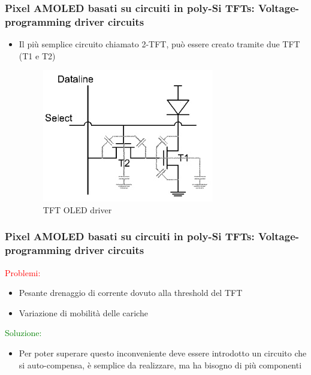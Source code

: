 \documentclass[12pt]{beamer}
\begin{document}
	\begin{frame}
		\frametitle{Pixel AMOLED basati su circuiti in poly-Si TFTs: Voltage-programming driver circuits}
		\begin{itemize}
			\item Il più semplice circuito chiamato 2-TFT, può essere creato tramite due TFT (T1 e T2)
			\begin{figure}
				\centering
				\includegraphics[width=0.7\linewidth]{FISICA/tft_oled_driver}
				\caption{TFT OLED driver}
				\label{fig:tftoleddriver}
			\end{figure}
		\end{itemize}
	\end{frame}
	\begin{frame}
		\frametitle{Pixel AMOLED basati su circuiti in poly-Si TFTs: Voltage-programming driver circuits}
		\textcolor{red}{Problemi:}
		\begin{itemize}
			\item Pesante drenaggio di corrente dovuto alla threshold del TFT
			\item Variazione di mobilità delle cariche
		\end{itemize}
		\pause
		\textcolor{green}{Soluzione:}
		\pause
		\begin{itemize}
			\item Per poter superare questo inconveniente deve essere introdotto un circuito che si auto-compensa, è semplice da realizzare, ma ha bisogno di più componenti
		\end{itemize}
	\end{frame}
\end{document}
